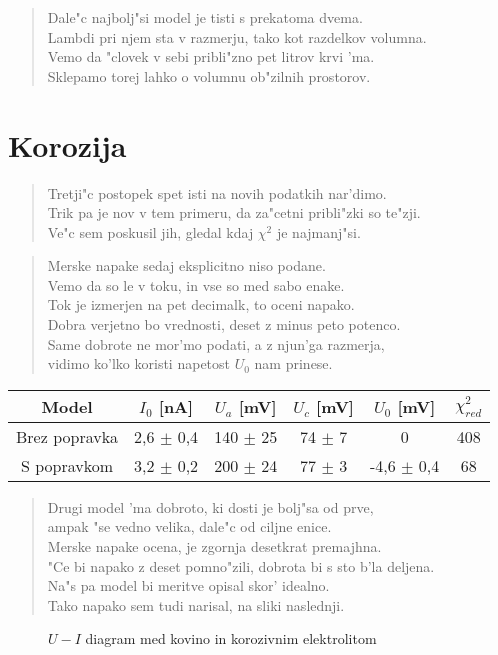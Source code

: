 \documentclass[a4paper,10pt]{article}
\begin{document}
\begin{verse}
 Dale"c najbolj"si model je tisti s prekatoma dvema. \\
 Lambdi pri njem sta v razmerju, tako kot razdelkov volumna. \\
 Vemo da "clovek v sebi pribli"zno pet litrov krvi 'ma. \\
 Sklepamo torej lahko o volumnu ob"zilnih prostorov. 
\end{verse}

\section{Korozija}
\begin{verse}
 Tretji"c postopek spet isti na novih podatkih nar'dimo. \\
 Trik pa je nov v tem primeru, da za"cetni pribli"zki so te"zji. \\
 Ve"c sem poskusil jih, gledal kdaj $\chi^2$ je najmanj"si. \\
\end{verse}

\begin{verse}
  Merske napake sedaj eksplicitno niso podane. \\
  Vemo da so le v toku, in vse so med sabo enake. \\
  Tok je izmerjen na pet decimalk, to oceni napako. \\
  Dobra verjetno bo vrednosti, deset z minus peto potenco. \\
  Same dobrote ne mor'mo podati, a z njun'ga razmerja, \\
  vidimo ko'lko koristi napetost $U_0$ nam prinese. 
\end{verse}

\begin{table}[h]
 \centering
\begin{tabular}{|c|c|c|c|c|c|}
\hline
Model & $I_0$ [nA] & $U_a$ [mV] & $U_c$ [mV] & $U_0$ [mV] & $\chi^2_{red}$ \\
\hline
Brez popravka & 2,6 $\pm$ 0,4 & 140 $\pm$ 25 & 74 $\pm$ 7 & 0 & 408 \\
S popravkom & 3,2 $\pm$ 0,2 & 200 $\pm$ 24 & 77 $\pm$ 3 & -4,6 $\pm$ 0,4 & 68 \\
\hline
\end{tabular}
\end{table}

\begin{verse}
 Drugi model 'ma dobroto, ki dosti je bolj"sa od prve, \\
 ampak "se vedno velika, dale"c od ciljne enice. \\
 Merske napake ocena, je zgornja desetkrat premajhna. \\
 "Ce bi napako z deset pomno"zili, dobrota bi s sto b'la deljena. \\
 Na"s pa model bi meritve opisal skor' idealno. \\
 Tako napako sem tudi narisal, na sliki naslednji. 
\end{verse}

\begin{figure}[h]
 
 \caption{$U-I$ diagram med kovino in korozivnim elektrolitom}
 \label{fig:korozija}
\end{figure}
\end{document}
